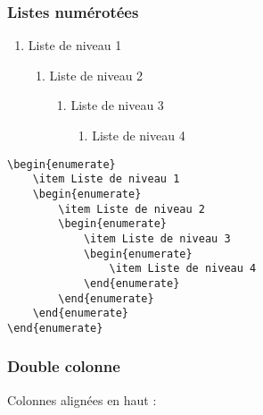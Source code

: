 \documentclass{article}
\begin{document}
\subsubsection{Listes numérotées}

\begin{enumerate}
    \item Liste de niveau 1
    \begin{enumerate}
        \item Liste de niveau 2
        \begin{enumerate}
            \item Liste de niveau 3
            \begin{enumerate}
                \item Liste de niveau 4
            \end{enumerate}
        \end{enumerate}
    \end{enumerate}
\end{enumerate}

\begin{verbatim}
\begin{enumerate}
    \item Liste de niveau 1
    \begin{enumerate}
        \item Liste de niveau 2
        \begin{enumerate}
            \item Liste de niveau 3
            \begin{enumerate}
                \item Liste de niveau 4
            \end{enumerate}
        \end{enumerate}
    \end{enumerate}
\end{enumerate}
\end{verbatim}

\clearpage
\subsubsection{Double colonne}

Colonnes alignées en haut :

\end{document}
